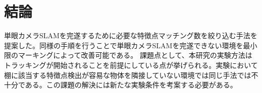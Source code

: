 \chapter{結論}

単眼カメラSLAMを完遂するために必要な特徴点マッチング数を絞り込む手法を提案した。同様の手順を行うことで単眼カメラSLAMを完遂できない環境を最小限のマーキングによって改善可能である。
課題点として、本研究の実験方法はトラッキングが開始されることを前提にしている点が挙げられる。実験において棚に該当する特徴点検出が容易な物体を隣接していない環境では同じ手法では不十分である。この課題の解決には新たな実験条件を考案する必要がある。


